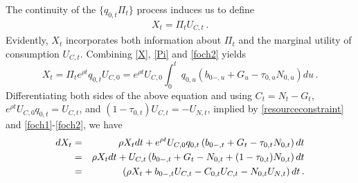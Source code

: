 \documentclass[12pt]{article}
\begin{document}
The continuity of the $\{q_{0, t}  \Pi_t\}$ process induces us to define %
\begin{align}\label{X}
X_t = \Pi_t U_{C, t}\, .
\end{align}
Evidently,  $X_t$ incorporates both information about  $\Pi_t$ and the marginal utility of consumption  $U_{C, t}$. 
Combining \eqref{X}, \eqref{Pi} and \eqref{foch2} yields
\begin{equation}
X_t =\Pi_t e^{\rho t}q_{0, t}U_{C, 0} = e^{\rho t} U_{C, 0} \int_{0}^t\, {q_{0, u}} \left(b_{0-, u} +G_u-\tau_{0, u} N_{0, u} \right)du \,.
\end{equation}
Differentiating both sides of the above equation  and using $C_t = N_t - G_t$, $e^{\rho t} U_{C, 0} q_{0, t}=U_{C, t}$, and $(1-\tau_{0, t}) U_{C, t}  = -  U_{N, t}$,  implied by \eqref{resourceconstraint} and \eqref{foch1}-\eqref{foch2}, we have
\begin{eqnarray}\label{dX} 
dX_t  &= & \rho  X_t dt +  e^{\rho t} U_{C, 0} q_{0, t} \left(b_{0-, t} +G_t-\tau_{0, t} N_{0, t} \right)dt   \notag\\
&= & \rho  X_t dt +  U_{C, t} \left(b_{0-, t} +G_t - N_{0,t} + (1-\tau_{0, t}) N_{0, t} \right)dt   \notag\\& = & \left(\rho X_{t}+b_{0-, t}U_{C, t}-C_{0, t}U_{C, t} -N_{0, t}U_{N, t}  \right)dt\,.
\end{eqnarray}
\end{document}
